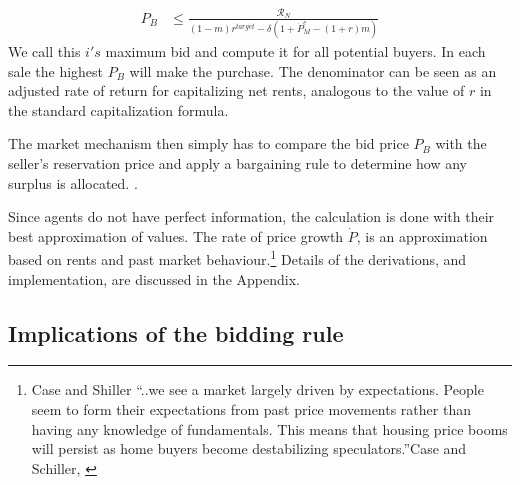 \begin{eqnarray}
P_B & \le    \frac{\mathcal{R}_N}{(1-m)r^{target}-\delta \left(1 + \dot P_M^e - (1+r)m\right)} \label{equation-Bidprice}\end{eqnarray}
We call this  $i's$ maximum bid and compute it for all potential buyers. In each sale the highest $P_B$ will make the purchase. The denominator can be seen as an adjusted rate of return for capitalizing net rents, analogous to the value of $r$ in  the standard capitalization formula.


The market mechanism then simply has to compare the bid price  $P_B$ with the seller's reservation price and apply a bargaining rule to determine how any surplus is allocated. .%


 Since  agents do not have perfect information, the calculation is done with their best approximation of values. %
 The rate of price growth $\dot P$, is an approximation based on rents and past market behaviour.\footnote{Case and Shiller ``..we see a market largely driven by expectations. People seem to form their expectations from past price movements rather than having any knowledge of fundamentals. This means that housing price booms will persist as home buyers become destabilizing speculators.''Case and Schiller, \cite{caseThereBubbleHousing2003}} Details of the derivations, and implementation, are discussed in the Appendix. %

 




\subsection{Implications of the bidding rule}

